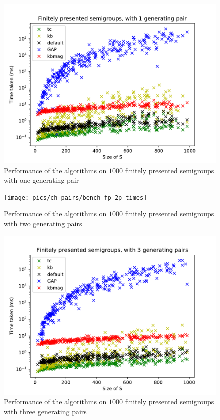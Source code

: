 \begin{figure}[h]
  \centering
  \includegraphics[width=\textwidth]{pics/ch-pairs/bench-fp-1p-times}
  \caption{Performance of the algorithms on $1000$ finitely presented semigroups
    with one generating pair}
  \label{fig:bench-fp-1p-times}
\end{figure}

\begin{figure}[h]
  \centering
  \texttt{[image: pics/ch-pairs/bench-fp-2p-times]}
  \caption{Performance of the algorithms on $1000$ finitely presented semigroups
    with two generating pairs}
  \label{fig:bench-fp-2p-times}
\end{figure}

\begin{figure}[h]
  \centering
  \includegraphics[width=\textwidth]{pics/ch-pairs/bench-fp-3p-times}
  \caption{Performance of the algorithms on $1000$ finitely presented semigroups
    with three generating pairs}
  \label{fig:bench-fp-3p-times}
\end{figure}

